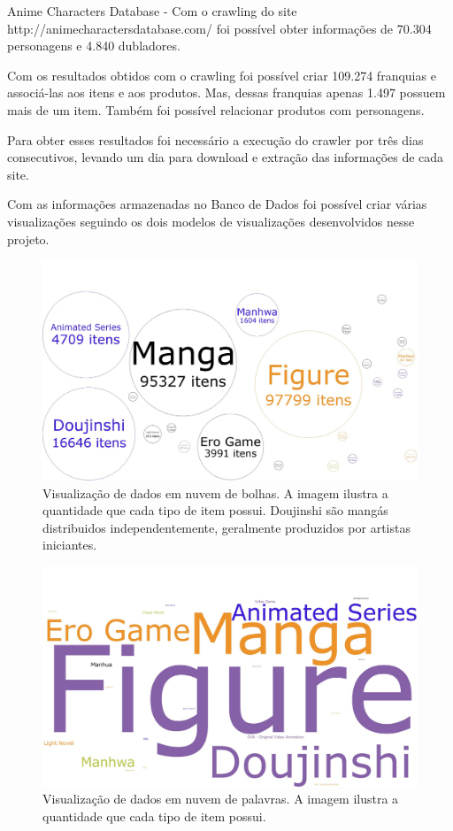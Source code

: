 \documentclass[12pt]{article}
\begin{document}
Anime Characters Database - Com o crawling do site http://animecharactersdatabase.com/ foi possível obter informações de 70.304 personagens e 4.840 dubladores.

Com os resultados obtidos com o crawling foi possível criar 109.274 franquias e associá-las aos itens e aos produtos. Mas, dessas franquias apenas 1.497 possuem mais de um item. Também foi possível relacionar produtos com personagens.

Para obter esses resultados foi necessário a execução do crawler por três dias consecutivos, levando um dia para download e extração das informações de cada site.  

Com as informações armazenadas no Banco de Dados foi possível criar várias visualizações seguindo os dois modelos de visualizações desenvolvidos nesse projeto.

\begin{figure}[H]
\centering
\includegraphics[width=1\textwidth]{item_amount_bubbles.pdf}
\caption{Visualização de dados em nuvem de bolhas. A imagem ilustra a quantidade que cada tipo de item possui. Doujinshi são mangás distribuidos independentemente, geralmente produzidos por artistas iniciantes.} \label{collaborator}
\end{figure}

\begin{figure}[H]
\centering
\includegraphics[width=1\textwidth]{items_amount_words.pdf}
\caption{Visualização de dados em nuvem de palavras. A imagem ilustra a quantidade que cada tipo de item possui.} \label{collaborator}
\end{figure}
\end{document}
